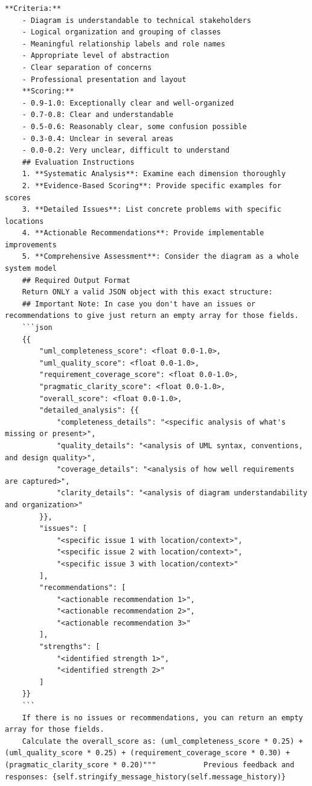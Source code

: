 \begin{lstlisting}[caption={Evaluation Prompt},label={lst:evaluation_prompt}, basicstyle=\ttfamily\tiny]
    **Criteria:**
    - Diagram is understandable to technical stakeholders
    - Logical organization and grouping of classes
    - Meaningful relationship labels and role names
    - Appropriate level of abstraction
    - Clear separation of concerns
    - Professional presentation and layout
    **Scoring:**
    - 0.9-1.0: Exceptionally clear and well-organized
    - 0.7-0.8: Clear and understandable
    - 0.5-0.6: Reasonably clear, some confusion possible
    - 0.3-0.4: Unclear in several areas
    - 0.0-0.2: Very unclear, difficult to understand
    ## Evaluation Instructions
    1. **Systematic Analysis**: Examine each dimension thoroughly
    2. **Evidence-Based Scoring**: Provide specific examples for scores
    3. **Detailed Issues**: List concrete problems with specific locations
    4. **Actionable Recommendations**: Provide implementable improvements
    5. **Comprehensive Assessment**: Consider the diagram as a whole system model
    ## Required Output Format
    Return ONLY a valid JSON object with this exact structure:
    ## Important Note: In case you don't have an issues or  recommendations to give just return an empty array for those fields.
    ```json
    {{
        "uml_completeness_score": <float 0.0-1.0>,
        "uml_quality_score": <float 0.0-1.0>,
        "requirement_coverage_score": <float 0.0-1.0>,
        "pragmatic_clarity_score": <float 0.0-1.0>,
        "overall_score": <float 0.0-1.0>,
        "detailed_analysis": {{
            "completeness_details": "<specific analysis of what's missing or present>",
            "quality_details": "<analysis of UML syntax, conventions, and design quality>",
            "coverage_details": "<analysis of how well requirements are captured>",
            "clarity_details": "<analysis of diagram understandability and organization>"
        }},
        "issues": [
            "<specific issue 1 with location/context>",
            "<specific issue 2 with location/context>",
            "<specific issue 3 with location/context>"
        ],
        "recommendations": [
            "<actionable recommendation 1>",
            "<actionable recommendation 2>",
            "<actionable recommendation 3>"
        ],
        "strengths": [
            "<identified strength 1>",
            "<identified strength 2>"
        ]
    }}
    ```
    If there is no issues or recommendations, you can return an empty array for those fields.
    Calculate the overall_score as: (uml_completeness_score * 0.25) + (uml_quality_score * 0.25) + (requirement_coverage_score * 0.30) + (pragmatic_clarity_score * 0.20)"""           Previous feedback and responses: {self.stringify_message_history(self.message_history)}

\end{lstlisting}
